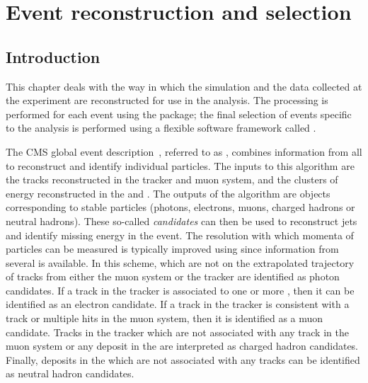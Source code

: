 \chapter{Event reconstruction and selection}
\label{chap:reconstruction}


\section{Introduction}
\label{reco:sec:intro}

This chapter deals with the way in which the simulation and the data collected at the \CMS experiment are reconstructed for use in the \Hgg analysis. 
The processing is performed for each event using the \CMSSW package; the final selection of events specific to the \Hgg analysis is performed using a flexible software framework called \FLASHgg. %

The CMS global event description~\cite{CMS-PAS-PFT-09-001,CMS-PAS-PFT-10-001}, referred to as \PF, combines information from all \CMS \subdetector\s to reconstruct and identify individual particles. The inputs to this algorithm are the tracks reconstructed in the tracker and muon system, and the clusters of energy reconstructed in the \ECAL and \HCAL. The outputs of the algorithm are objects corresponding to stable particles (photons, electrons, muons, charged hadrons or neutral hadrons). These so-called \PF \emph{candidates} can then be used to reconstruct jets and identify missing energy in the event. The resolution with which momenta of particles can be measured is typically improved using \PF since information from several \subdetector\s is available. In this scheme, \ECAL \SC\s which are not on the extrapolated trajectory of tracks from either the muon system or the tracker are identified as photon candidates. If a track in the tracker is associated to one or more \ECAL \SC\s, then it can be identified as an electron candidate. If a track in the tracker is consistent with a track or multiple hits in the muon system, then it is identified as a muon candidate. Tracks in the tracker which are not associated with any track in the muon system or any deposit in the \ECAL are interpreted as charged hadron candidates. Finally, deposits in the \HCAL which are not associated with any tracks can be identified as neutral hadron candidates.

